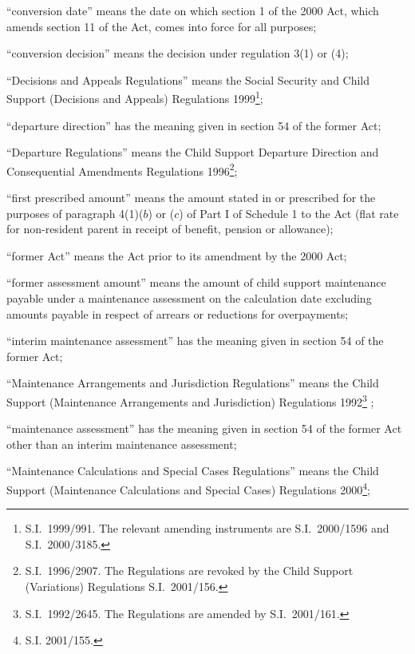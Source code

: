 \documentclass[12pt,a4paper]{article}
\begin{document}
\begin{enumerate}
“conversion date” means the date on which section 1 of the 2000 Act, which amends section 11 of the Act, comes into force for all purposes;

“conversion decision” means the decision under regulation 3(1) or (4);

“Decisions and Appeals Regulations” means the Social Security and Child Support (Decisions and Appeals) Regulations 1999\footnote{S.I.\ 1999/991. The relevant amending instruments are S.I.\ 2000/1596 and S.I.\ 2000/3185.};

“departure direction” has the meaning given in section 54 of the former Act;

“Departure Regulations” means the Child Support Departure Direction and Consequential Amendments Regulations 1996\footnote{S.I.\ 1996/2907. The Regulations are revoked by the Child Support (Variations) Regulations S.I.\ 2001/156.};

“first prescribed amount” means the amount stated in or prescribed for the purposes of paragraph 4(1)($b$)  or ($c$)  of Part I of Schedule 1 to the Act (flat rate for non-resident parent in receipt of benefit, pension or allowance);

“former Act” means the Act prior to its amendment by the 2000 Act;

“former assessment amount” means the amount of child support maintenance payable under a maintenance assessment on the calculation date excluding amounts payable in respect of arrears or reductions for overpayments;

“interim maintenance assessment” has the meaning given in section 54 of the former Act;

“Maintenance Arrangements and Jurisdiction Regulations” means the Child Support (Maintenance Arrangements and Jurisdiction) Regulations 1992\footnote{S.I.\ 1992/2645. The Regulations are amended by S.I.\ 2001/161.}%
;

“maintenance assessment” has the meaning given in section 54 of the former Act other than an interim maintenance assessment;

“Maintenance Calculations and Special Cases Regulations” means the Child Support (Maintenance Calculations and Special Cases) Regulations 2000\footnote{\frenchspacing S.I. 2001/155.};


\end{enumerate}
\end{document}
